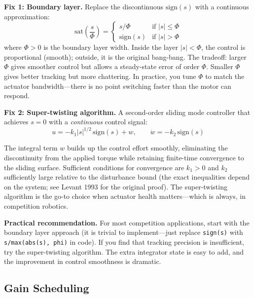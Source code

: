 \textbf{Fix 1: Boundary layer.} Replace the discontinuous $\mathrm{sign}(s)$ with a continuous approximation:
\begin{equation}
\mathrm{sat}\!\left(\frac{s}{\Phi}\right) = \begin{cases} s/\Phi & \text{if } |s| \leq \Phi \\ \mathrm{sign}(s) & \text{if } |s| > \Phi \end{cases}
\end{equation}
where $\Phi > 0$ is the boundary layer width. Inside the layer $|s| < \Phi$, the control is proportional (smooth); outside, it is the original bang-bang. The tradeoff: larger $\Phi$ gives smoother control but allows a steady-state error of order $\Phi$. Smaller $\Phi$ gives better tracking but more chattering. In practice, you tune $\Phi$ to match the actuator bandwidth---there is no point switching faster than the motor can respond.

\textbf{Fix 2: Super-twisting algorithm.} A second-order sliding mode controller that achieves $s = 0$ with a \textit{continuous} control signal:
\begin{equation}
u = -k_1 |s|^{1/2}\,\mathrm{sign}(s) + w, \qquad \dot{w} = -k_2\,\mathrm{sign}(s)
\end{equation}

The integral term $w$ builds up the control effort smoothly, eliminating the discontinuity from the applied torque while retaining finite-time convergence to the sliding surface. Sufficient conditions for convergence are $k_1 > 0$ and $k_2$ sufficiently large relative to the disturbance bound (the exact inequalities depend on the system; see Levant 1993 for the original proof). The super-twisting algorithm is the go-to choice when actuator health matters---which is always, in competition robotics.

\textbf{Practical recommendation.} For most competition applications, start with the boundary layer approach (it is trivial to implement---just replace \texttt{sign(s)} with \texttt{s/max(abs(s), phi)} in code). If you find that tracking precision is insufficient, try the super-twisting algorithm. The extra integrator state is easy to add, and the improvement in control smoothness is dramatic.

\subsection{Gain Scheduling}

